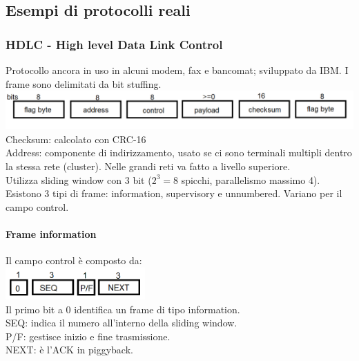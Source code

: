 \documentclass[10pt,a4paper,twoside]{article}
\begin{document}
\subsection{Esempi di protocolli reali}

\subsubsection{HDLC - High level Data Link Control}
Protocollo ancora in uso in alcuni modem, fax e bancomat; sviluppato da IBM. I frame sono delimitati da bit stuffing.\\
\includegraphics[width=\textwidth]{images/hdlc.png}\\
Checksum: calcolato con CRC-16\\
Address: componente di indirizzamento, usato se ci sono terminali multipli dentro la stessa rete (cluster). Nelle grandi reti va fatto a livello superiore.\\
Utilizza sliding window con 3 bit ($2^3=8$ spicchi, parallelismo massimo 4).\\
Esistono 3 tipi di frame: information, supervisory e unnumbered. Variano per il campo control.
\paragraph{Frame information} Il campo control è composto da:\\
\includegraphics[width=0.4\textwidth]{images/hdlc_information.png}\\
Il primo bit a 0 identifica un frame di tipo information.\\
SEQ: indica il numero all'interno della sliding window.\\
P/F: gestisce inizio e fine trasmissione.\\
NEXT: è l'ACK in piggyback.
\end{document}
